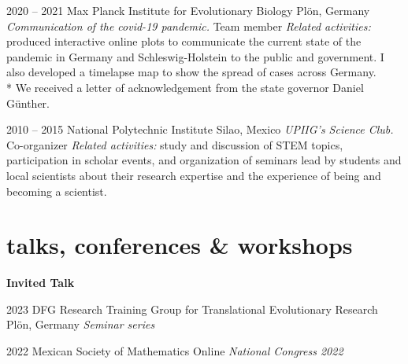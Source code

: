 \documentclass[]{friggeri-cv} %
\begin{document}
\begin{entrylist}
\entry
{2020 -- 2021}
{}
{Max Planck Institute for Evolutionary Biology}
{Plön, Germany}
{{\normalsize\emph{Communication of the covid-19 pandemic.} Team member}}
{\emph{Related activities:} produced interactive online plots to communicate the current state of the pandemic in  Germany and Schleswig-Holstein to the public and government. I also developed a timelapse map to show the spread of cases across Germany.\\
\** We received a letter of acknowledgement from the state governor Daniel Günther.}
\end{entrylist}
\begin{entrylist}
\entry
{2010 -- 2015}
{}
{National Polytechnic Institute}
{Silao, Mexico}
{{\normalsize\emph{UPIIG’s Science Club.} Co-organizer}}
{\emph{Related activities:} study and discussion of STEM topics, participation in scholar events, and organization of seminars lead by students and local scientists about their research expertise and the experience of being and becoming a scientist.}
\end{entrylist}


\section{talks, conferences \& workshops}

\textbf{Invited Talk}

\begin{entrylist}
\entry
{2023}
{}
{DFG Research Training Group for Translational Evolutionary Research}
{Plön, Germany}
{{\normalsize\emph{Seminar series}}}
{\vspace{-3mm}}
\end{entrylist}
\begin{entrylist}
\entry
{2022}
{}
{Mexican Society of Mathematics}
{Online}
{{\normalsize\emph{National Congress 2022}}}
{\vspace{-3mm}}
\end{entrylist}
\end{document}
